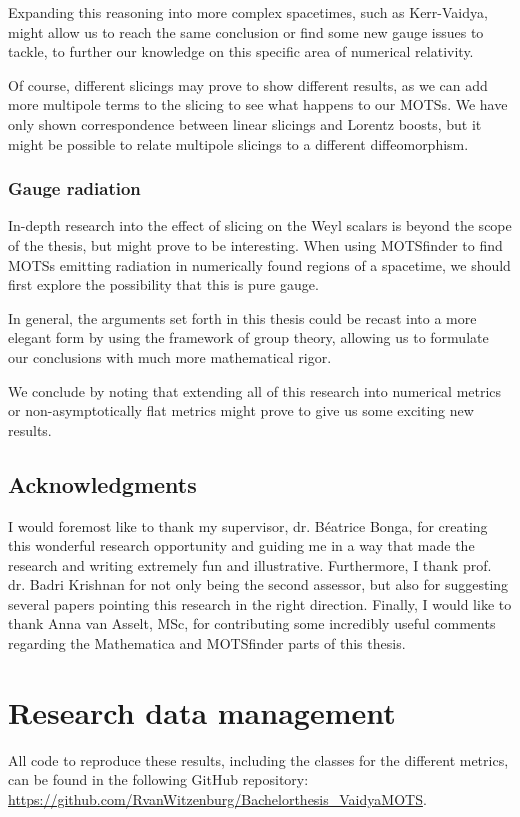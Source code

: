 \documentclass[twoside, openright]{RadboudReport}
\begin{document}
Expanding this reasoning into more complex spacetimes, such as Kerr-Vaidya, might allow us to reach the same conclusion or find some new gauge issues to tackle, to further our knowledge on this specific area of numerical relativity. \newline

Of course, different slicings may prove to show different results, as we can add more multipole terms to the slicing to see what happens to our MOTSs. We have only shown correspondence between linear slicings and Lorentz boosts, but it might be possible to relate multipole slicings to a different diffeomorphism. 

\subsection{Gauge radiation}

In-depth research into the effect of slicing on the Weyl scalars is beyond the scope of the thesis, but might prove to be interesting. When using MOTSfinder to find MOTSs emitting radiation in numerically found regions of a spacetime, we should first explore the possibility that this is pure gauge.\newline

In general, the arguments set forth in this thesis could be recast into a more elegant form by using the framework of group theory, allowing us to formulate our conclusions with much more mathematical rigor.\newline

We conclude by noting that extending all of this research into numerical metrics or non-asymptotically flat metrics might prove to give us some exciting new results.

\section{Acknowledgments}

I would foremost like to thank my supervisor, dr. Béatrice Bonga, for creating this wonderful research opportunity and guiding me in a way that made the research and writing extremely fun and illustrative. Furthermore, I thank prof. dr. Badri Krishnan for not only being the second assessor, but also for suggesting several papers pointing this research in the right direction. Finally, I would like to thank Anna van Asselt, MSc, for contributing some incredibly useful comments regarding the Mathematica and MOTSfinder parts of this thesis. 



\appendix
\chapter{Research data management}
\label{chapter:rdm}
All code to reproduce these results, including the classes for the different metrics, can be found in the following GitHub repository: \textcolor{cyan}{\url{ https://github.com/RvanWitzenburg/Bachelorthesis_VaidyaMOTS}}.

\newpage
\printbibliography[heading=bibintoc]
\end{document}

